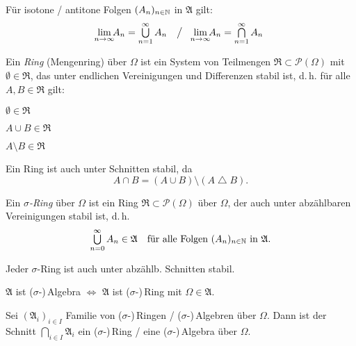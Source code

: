\documentclass{cheat-sheet}
\newcommand{\Alg}{\mathfrak{A}} %
\newcommand{\Ring}{\mathfrak{R}} %
\DeclareMathOperator{\symmdiff}{\triangle}
\begin{document}
\begin{satz}
  Für isotone / antitone Folgen $(A_n)_{n \in \mathbb{N}}$ in $\Alg$ gilt:
  \[
    \lim_{\mathclap{n \to \infty}} A_n = \bigcup_{n=1}^\infty A_n
    \quad \big/ \quad
    \lim_{\mathclap{n \to \infty}} A_n = \bigcap_{n=1}^\infty A_n
  \]
\end{satz}

\begin{defn}
  Ein \emph{Ring} (Mengenring) über $\Omega$ ist ein System von Teilmengen $\Ring \subset \mathcal{P}(\Omega)$ mit $\emptyset \in \Ring$, das unter endlichen Vereinigungen und Differenzen stabil ist, d.\,h. für alle $A, B \in \Ring$ gilt:
  \begin{itemize}
    \begin{multicols}{3}
      \item $\emptyset \in \Ring$
      \item $A \cup B \in \Ring$
      \item $A \setminus B \in \Ring$
    \end{multicols}
  \end{itemize}
\end{defn}

\begin{bem}
  Ein Ring ist auch unter Schnitten stabil, da
  \[ A \cap B = (A \cup B) \setminus (A \symmdiff B). \]
\end{bem}

\begin{defn}
  Ein \emph{$\sigma$-Ring} über $\Omega$ ist ein Ring $\Ring \subset \mathcal{P}(\Omega)$ über $\Omega$, der auch unter abzählbaren Vereinigungen stabil ist, d.\,h.
  \[ \bigcup_{n = 0}^{\infty} A_n \in \Alg \quad \text{für alle Folgen $(A_n)_{n \in \N}$ in $\Alg$}. \]
\end{defn}

\begin{bem}
  Jeder $\sigma$-Ring ist auch unter abzählb. Schnitten stabil.
\end{bem}

\begin{satz}
  $\Alg$ ist ($\sigma$-)\,Algebra $\iff$ $\Alg$ ist ($\sigma$-)\,Ring mit $\Omega \in \Alg$.
\end{satz}

\begin{satz}
  Sei $(\Alg_i)_{i \in I}$ Familie von ($\sigma$-)\,Ringen / ($\sigma$-)\,Algebren über $\Omega$. Dann ist der Schnitt $\bigcap_{i \in I} \Alg_i$ ein ($\sigma$-)\,Ring / eine ($\sigma$-)\,Algebra über $\Omega$.
\end{satz}
\end{document}
